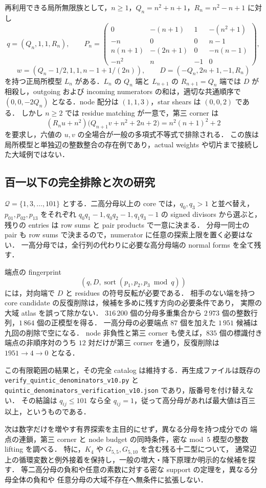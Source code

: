 再利用できる局所無限族として，$n\geq1$，$Q_n=n^2+n+1$，$R_n=n^2-n+1$ に対し
\[
 q=(Q_n,1,1,R_n),\qquad
 P_n=\begin{pmatrix}
 0&-(n+1)&1&-(n^2+1)\\
 -n&0&0&n-1\\
 n(n+1)&-(2n+1)&0&-n(n-1)\\
 -n^2&n&-1&0
 \end{pmatrix},
\]
\[
 w=(Q_n-1/2,1,1,n-1+1/(2n)),\qquad
 D=(-Q_n,2n+1,-1,R_n)
\]
を持つ正局所模型 $L_n$ がある．$L_n$ の $Q_n$ 端と $L_{n+1}$ の $R_{n+1}=Q_n$ 端では
$D$ が相殺し，outgoing および incoming numerators の和は，適切な共通順序で
$(0,0,-2Q_n)$ となる．node 配分は $(1,1,3)$，star shears は $(0,0,2)$ である．
しかし $n\geq2$ では residue matching が一意で，第三 corner は
\[
 (R_nu+n^2)\bigl(Q_{n+1}v+n^2+2n+2\bigr)
   =n^2(n+1)^2+2
\]
を要求し，六値の $u,v$ の全場合が一般の多項式不等式で排除される．
この族は局所模型と単独辺の整数整合の存在例であり，actual weights や切片まで接続した大域例ではない．

\subsection{百一以下の完全排除と次の研究}

$\mathcal Q=\{1,3,\ldots,101\}$ とする．二高分母以上の core では，$q_0,q_3>1$ と並べ替え，
$p_{01},p_{02},p_{13}$ をそれぞれ $q_0q_1-1,q_0q_2-1,q_1q_3-1$ の signed divisors から選ぶと，
残りの entries は row sums と pair products で一意に決まる．
分母一同士の pair も row sums で決まるので，numerator に任意の探索上限を置く必要はない．
一高分母では，全行列の代わりに必要な高分母端の normal forms を全て残す．

端点の fingerprint
\[
 \left(q,D,\operatorname{sort}(p_1,p_2,p_3\bmod q)\right)
\]
には，対向端で $D$ と residues の符号反転が必要である．
相手のない端を持つ core candidate の反復削除は，候補を多めに残す方向の必要条件であり，
実際の大域 atlas を誤って除かない．
$316\,200$ 個の分母多重集合から $2\,973$ 個の整数行列，$1\,864$ 個の正模型を得る．
一高分母の必要端点 $87$ 個を加えた $1\,951$ 候補は九回の削除で空になる．
node 非負性と第三 corner も使えば，$835$ 個の標識付き端点の非順序対のうち
$12$ 対だけが第三 corner を通り，反復削除は $1951\to4\to0$ となる．

この有限範囲の結果と，その完全 catalog は維持する．再生成ファイルは既存の
\nolinkurl{verify_quintic_denominators_v10.py} と
\nolinkurl{quintic_denominators_verification_v10.json} であり，版番号を付け替えない．
その結論は $q_{ij}\leq101$ なら全 $q_{ij}=1$，従って高分母があれば最大値は百三以上，というものである．

次は数字だけを増やす有界探索を主目的にせず，異なる分母を持つ成分での
端点の連鎖，第三 corner と node budget の同時条件，密な mod~$5$ 模型の整数 lifting を調べる．
特に，$K_4$ や $G_{5,5},G_{5,10}$ を含む残る十二型について，
通常辺上の循環変数と例外接着を保持し，一般の増大・降下原理か明示的な候補を探す．
等二高分母の負和や任意の素数に対する密な support の定理を，異なる分母全体の負和や
任意分母の大域不存在へ無条件に拡張しない．
